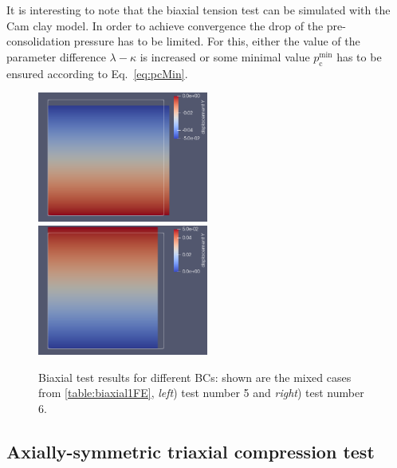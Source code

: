 \documentclass[paper=a4, twoside, pagesize]{scrartcl}
\renewcommand{\c}{\text{c}}
\begin{document}
It is interesting to note that the biaxial tension test can be simulated with the Cam clay model. In order to achieve convergence the drop of the pre-consolidation pressure has to be limited. For this, either the value of the parameter difference $\lambda - \kappa$ is increased or some minimal value $p^\text{min}_\c$ has to be ensured according to Eq.~\eqref{eq:pcMin}.

\begin{figure}[h]
  \includegraphics[width=0.5\textwidth]{img/SemiExplicitModifiedCamClay_OpenGeoSys2023/BiaxtestCamClay_TopComprRightTension.png}
  \includegraphics[width=0.5\textwidth]{img/SemiExplicitModifiedCamClay_OpenGeoSys2023/BiaxtestCamClay_TopTensionRightCompr.png}
  \caption{Biaxial test results for different BCs: shown are the mixed cases from \autoref{table:biaxial1FE}, \textsl{left}) test number 5 and \textsl{right}) test number 6.}\label{fig:biaxMixedCases}
\end{figure}


\subsection{Axially-symmetric triaxial compression test}\label{subsec:triaxialCompression}
\end{document}
